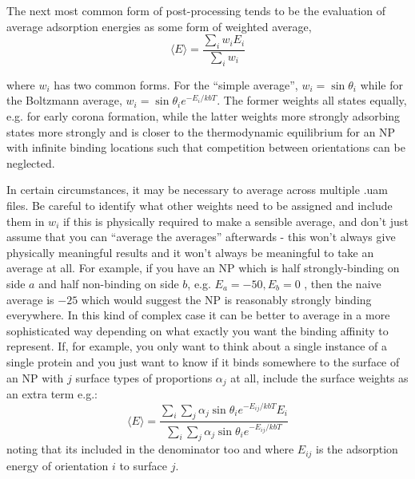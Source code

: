 \documentclass[10pt,a4paper,onecolumn]{report}
\begin{document}
The next most common form of post-processing tends to be the evaluation of average adsorption energies as some form of weighted average,
\begin{equation}
\langle E \rangle = \frac{ \sum_i w_i E_i}{\sum_i w_i}
\end{equation}

where $w_i$ has two common forms. For the ``simple average'', $w_i = \sin \theta_i$ while for the Boltzmann average, $w_i = \sin \theta_i e^{-E_i/kbT}$. The former weights all states equally, e.g. for early corona formation, while the latter weights more strongly adsorbing states more strongly and is closer to the thermodynamic equilibrium for an NP with infinite binding locations such that competition between orientations can be neglected. 

In certain circumstances, it may be necessary to average across multiple .uam files. Be careful to identify what other weights need to be assigned and include them in $w_i$ if this is physically required to make a sensible average, and don't just assume that you can ``average the averages'' afterwards - this won't always give physically meaningful results and it won't always be meaningful to take an average at all. For example, if you have an NP which is half strongly-binding on side $a$ and half non-binding on side $b$, e.g. $E_a = -50, E_b = 0$ , then the naive average is $-25$ which would suggest the NP is reasonably strongly binding everywhere. In this kind of complex case it can be better to average in a more sophisticated way depending on what exactly you want the binding affinity to represent. If, for example, you only want to think about a single instance of a single protein and you just want to know if it binds somewhere to the surface of an NP with $j$ surface types of proportions $\alpha_j$ at all, include the surface weights as an extra term e.g.:
\begin{equation}
\langle E \rangle = \frac{ \sum_i \sum_j \alpha_j \sin \theta_i e^{-E_{ij}/kbT} E_i}{\sum_i \sum_j \alpha_j \sin \theta_i e^{-E_{ij}/kbT}}
\end{equation}
noting that its included in the denominator too and where $E_{ij}$ is the adsorption energy of orientation $i$ to surface $j$. 
\end{document}
